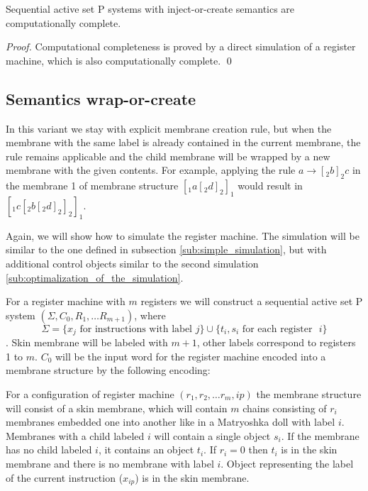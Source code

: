 \documentclass[llncs,submission,copyright,creativecommons]{../lib/lncs/llncs}
\begin{document}
\begin{theorem}
  Sequential active set P systems with inject-or-create semantics are computationally complete.
\end{theorem}

\begin{proof}
  Computational completeness is proved by a direct simulation of a register machine, which is also computationally complete. \qed
\end{proof}


\subsection{Semantics wrap-or-create} %
\label{sub:semantics_wrap_or_create}

In this variant we stay with explicit membrane creation rule, but when the membrane with the same label is already contained in the current membrane, the rule remains applicable and the child membrane will be wrapped by a new membrane with the given contents. For example, applying the rule $a \rightarrow [_2 b ]_2 c$ in the membrane 1 of membrane structure $[_1 a [_2 d ]_2 ]_1$ would result in $[_1 c [_2 b [_2 d ]_2 ]_2 ]_1$.

Again, we will show how to simulate the register machine. The simulation will be similar to the one defined in subsection \ref{sub:simple_simulation}, but with additional control objects similar to the second simulation \ref{sub:optimalization_of_the_simulation}.

For a register machine with $m$ registers we will construct a sequential active set P system $(\Sigma, C_0, R_1, \ldots R_{m+1})$, where $$\Sigma = \{x_j \text{~for instructions with label~} j\}\cup\{t_i, s_i \text{~for each register ~}i\}$$. Skin membrane will be labeled with $m+1$, other labels correspond to registers 1 to $m$. $C_0$ will be the input word for the register machine encoded into a membrane structure by the following encoding: 

For a configuration of register machine $(r_1, r_2, \ldots r_m, ip)$ the membrane structure will consist of a skin membrane, which will contain $m$ chains consisting of $r_i$ membranes embedded one into another like in a Matryoshka doll with label $i$. Membranes with a child labeled $i$ will contain a single object $s_i$. If the membrane has no child labeled $i$, it contains an object $t_i$. If $r_i = 0$ then $t_i$ is in the skin membrane and there is no membrane with label $i$. Object representing the label of the current instruction ($x_{ip}$) is in the skin membrane.
\end{document}
